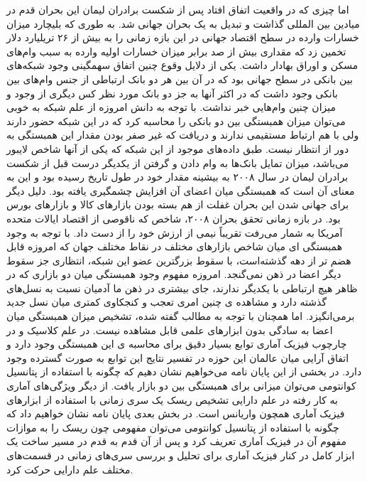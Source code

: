 \documentclass[a4paper,titlepage,12pt,fleqn,oneside]{report}
\begin{document}
اما چیزی که در واقعیت اتفاق افتاد پس از شکست برادران لیمان این بحران قدم در میادین بین المللی گذاشت و تبدیل به یک بحران جهانی شد.  به طوری که بلیچارد  میزان خسارات وارده در سطح اقتصاد جهانی در این بازه زمانی را به بیش از ۲۶ تریلیارد دلار تخمین زد که مقداری بیش از صد برابر میزان خسارات اولیه وارده به سبب وام‌های مسکن و اوراق بهادار داشت.  
یکی از دلایل وقوع چنین اتفاق  سهمگینی وجود شبکه‌های بین بانکی در سطح جهانی بود که در آن بین هر دو بانک ارتباطی از جنس وام‌های بین بانکی وجود داشت که در اکثر آنها به جز دو بانک مورد نظر کس دیگری از وجود و میزان چنین وام‌هایی خبر نداشت.  با توجه به دانش امروزه  از علم شبکه به خوبی می‌توان میزان همبستگی بین دو بانکی را محاسبه کرد که در این شبکه حضور دارند ولی با هم ارتباط مستقیمی ندارند و دریافت که غیر صفر بودن مقدار این همبستگی به دور از انتظار نیست.  طبق داده‌های موجود از این شبکه که یکی از آنها شاخص لایبور می‌باشد،  میزان تمایل بانک‌ها به وام دادن و گرفتن از یکدیگر درست قبل از شکست برادران لیمان در سال ۲۰۰۸ به بیشینه مقدار خود در طول تاریخ رسیده بود و این به معنای آن است که همبستگی میان اعضای آن افزایش چشمگیری یافته بود. 
دلیل دیگر برای جهانی شدن این بحران غفلت از هم بسته بودن بازارهای کالا و بازارهای بورس بود. در بازه زمانی تحقق  بحران ۲۰۰۸،   شاخص  که ناقوصی از اقتصاد ایالات متحده آمریکا به شمار می‌رفت تقریباً نیمی از ارزش خود را از دست داد.  با توجه به وجود همبستگی ای میان شاخص بازارهای مختلف در نقاط مختلف جهان که امروزه قابل هضم تر از دهه گذشته‌است،  با سقوط بزرگترین عضو این شبکه،  انتظاری جز سقوط دیگر اعضا در ذهن نمی‌گنجد.
امروزه مفهوم وجود همبستگی میان دو بازاری که در ظاهر هیچ ارتباطی با یکدیگر ندارند،  جای بیشتری در ذهن ما آدمیان نسبت به نسل‌های گذشته دارد و مشاهده ی چنین امری تعجب و کنجکاوی کمتری میان نسل جدید برمی‌انگیزد. اما همچنان با توجه به مطالب گفته شده، تشخیص میزان همبستگی میان اعضا به سادگی بدون ابزارهای علمی قابل مشاهده نیست. در علم کلاسیک و در چارچوب فیزیک آماری توابع بسیار دقیق برای محاسبه ی این همبستگی وجود دارد و اتفاق آرایی میان عالمان این حوزه در تفسیر نتایج این توابع به صورت گسترده وجود دارد. در بخشی از این پایان نامه می‌خواهیم نشان دهیم که چگونه با استفاده از پتانسیل کوانتومی می‌توان میزانی برای همبستگی بین دو بازار یافت.  از دیگر ویژگی‌های آماری به کار رفته در علم دارایی تشخیص ریسک یک سری زمانی با استفاده از ابزار‌های فیزیک آماری همچون واریانس است. در بخش بعدی پایان نامه نشان خواهیم داد که چگونه با استفاده از پتانسیل کوانتومی می‌توان  مفهومی چون ریسک را به موازات مفهوم آن در فیزیک آماری تعریف کرد و پس از آن قدم به قدم در مسیر ساخت یک ابزار کامل در کنار فیزیک آماری برای تحلیل و بررسی سری‌های زمانی در قسمت‌های مختلف علم دارایی حرکت کرد.
 \newpage
\end{document}
